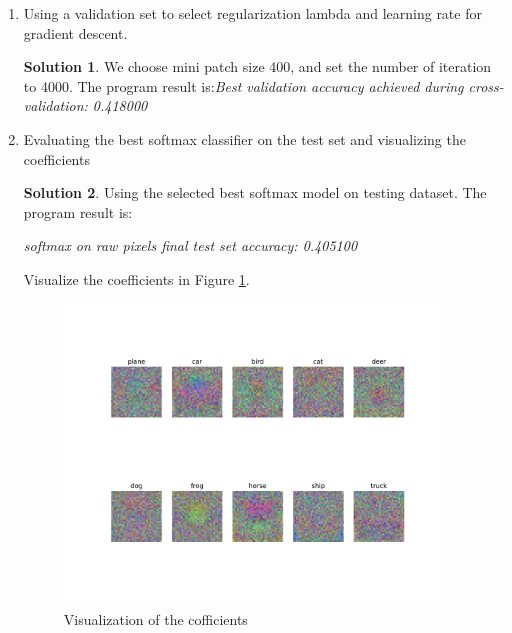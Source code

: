 \documentclass[]{book}
\theoremstyle{definition}
\newtheorem*{soln}{Solution}
\begin{document}
\begin{enumerate}
\item Using a validation set to select regularization lambda and learning rate for gradient descent.
\begin{soln}
	We choose mini patch size 400, and set the number of iteration to 4000. The program result is:\textsl{Best validation accuracy achieved during cross-validation: 0.418000}
\end{soln}

\item Evaluating the best softmax classifier on the test set and visualizing the coefficients
\begin{soln}
	Using the selected best softmax model on testing dataset. The program result is:
	
	\textsl{softmax on raw pixels final test set accuracy: 0.405100 }
	
	Visualize the coefficients in Figure \ref{fig:cofficient}.  
	\begin{figure}[H]
		\centering
		\includegraphics[width=10cm]{cofficients.pdf}
		\caption{Visualization of the cofficients}
		\label{fig:cofficient}
	\end{figure}

\end{soln}

\end{enumerate}
\end{document}
